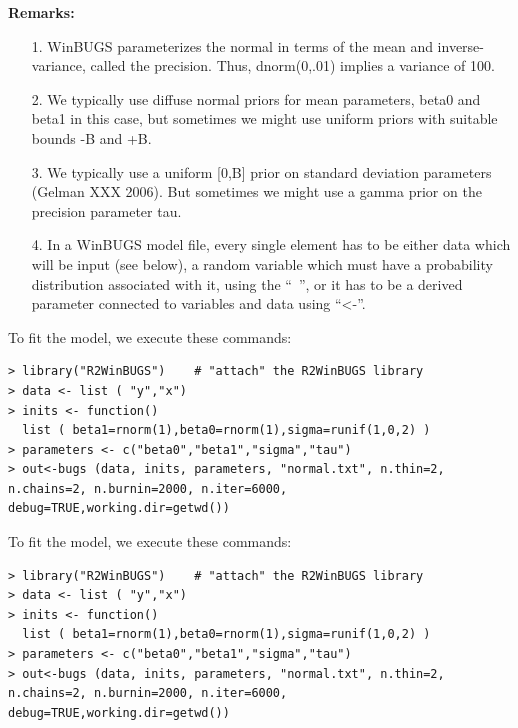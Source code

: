 {\bf Remarks:}
\begin{itemize}
\item[1.]WinBUGS parameterizes the normal in terms of the mean and inverse-variance, called the precision. Thus, dnorm(0,.01) implies a variance of 100.
\item[2.]We typically use diffuse normal priors for mean parameters, beta0 and beta1 in this case, but sometimes we might use uniform priors with suitable bounds -B and +B.
\item[3.]We typically use a uniform [0,B] prior on standard deviation parameters (Gelman XXX 2006). But sometimes we might use a gamma prior on the precision parameter tau.
\item[4.]In a WinBUGS model file, every single element has to be either data which will be input (see below), a random variable which must have a probability distribution associated with it, using the ``~'', or it has to be a derived parameter connected to variables and data using ``<-''.

\end{itemize}

To fit the model, we execute these commands:
\begin{verbatim}
> library("R2WinBUGS")    # "attach" the R2WinBUGS library
> data <- list ( "y","x")
> inits <- function()
  list ( beta1=rnorm(1),beta0=rnorm(1),sigma=runif(1,0,2) )
> parameters <- c("beta0","beta1","sigma","tau")
> out<-bugs (data, inits, parameters, "normal.txt", n.thin=2, n.chains=2, n.burnin=2000, n.iter=6000, debug=TRUE,working.dir=getwd())
\end{verbatim}
To fit the model, we execute these commands:
\begin{verbatim}
> library("R2WinBUGS")    # "attach" the R2WinBUGS library
> data <- list ( "y","x")
> inits <- function()
  list ( beta1=rnorm(1),beta0=rnorm(1),sigma=runif(1,0,2) )
> parameters <- c("beta0","beta1","sigma","tau")
> out<-bugs (data, inits, parameters, "normal.txt", n.thin=2, n.chains=2, n.burnin=2000, n.iter=6000, debug=TRUE,working.dir=getwd())
\end{verbatim}


